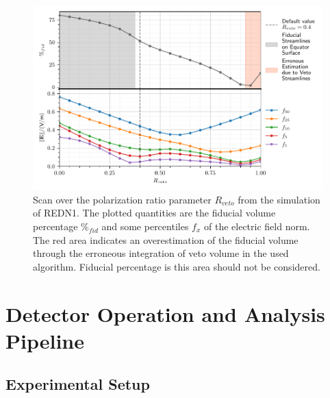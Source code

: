 \begin{figure}
\centering
\includegraphics[scale=1]{Figures/ElectrodesExperimental/redn1_scan_veto_ratio.pdf}
\caption{Scan over the polarization ratio parameter $R_{veto}$ from the simulation of REDN1. The plotted quantities are the fiducial volume percentage $\%_{fid}$ and some percentiles $f_x$ of the electric field norm. The red area indicates an overestimation of the fiducial volume through the erroneous integration of veto volume in the used algorithm. Fiducial percentage is this area should not be considered.}
\label{fig:redn1-scan}
\end{figure}


\section{Detector Operation and Analysis Pipeline}


\subsection{Experimental Setup}

